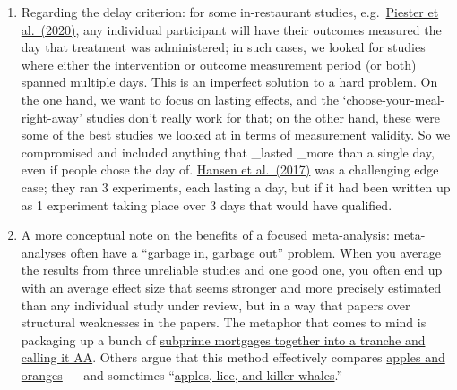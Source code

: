 \documentclass[
  letterpaper,
  DIV=11,
  numbers=noendperiod]{scrartcl}
\begin{document}
\begin{enumerate}
{  al.~(2021b)}, who find a substantial ``discrepancy between intentions
  and reported consumption'' and conclude that ``reported intentions may
  be a poor proxy for reported actual consumption'' (this is a
  well-understood problem in
  \href{https://pubmed.ncbi.nlm.nih.gov/7635601/}{dietary},
  \href{https://www.ncbi.nlm.nih.gov/pmc/articles/PMC6125069/}{health},
  \href{https://www.sciencedirect.com/science/article/abs/pii/S0148296322003848}{and}
  \href{https://www.frontiersin.org/articles/10.3389/fpsyg.2022.923464/full}{psychology}
  \href{https://www.ncbi.nlm.nih.gov/pmc/articles/PMC2346472/}{research}).
\item
  Regarding the delay criterion: for some in-restaurant studies,
  e.g.~\href{https://www.sciencedirect.com/science/article/abs/pii/S0195666319312115?via\%3Dihub}{Piester
  et al.~(2020)}, any individual participant will have their outcomes
  measured the day that treatment was administered; in such cases, we
  looked for studies where either the intervention or outcome
  measurement period (or both) spanned multiple days. This is an
  imperfect solution to a hard problem. On the one hand, we want to
  focus on lasting effects, and the `choose-your-meal-right-away'
  studies don't really work for that; on the other hand, these were some
  of the best studies we looked at in terms of measurement validity. So
  we compromised and included anything that \_lasted \_more than a
  single day, even if people chose the day of.
  \href{https://academic.oup.com/jpubhealth/article/43/2/392/5637580}{Hansen
  et al.~(2017)} was a challenging edge case; they ran 3 experiments,
  each lasting a day, but if it had been written up as 1 experiment
  taking place over 3 days that would have qualified.
\item
  A more conceptual note on the benefits of a focused meta-analysis:
  meta-analyses often have a ``garbage in, garbage out'' problem. When
  you average the results from three unreliable studies and one good
  one, you often end up with an average effect size that seems stronger
  and more precisely estimated than any individual study under review,
  but in a way that papers over structural weaknesses in the papers. The
  metaphor that comes to mind is packaging up a bunch of
  \href{https://www.youtube.com/watch?v=II4Ct2n5FiE}{subprime mortgages
  together into a tranche and calling it AA}. Others argue that this
  method effectively compares
  \href{https://onlinelibrary.wiley.com/doi/abs/10.1111/ajps.12742}{apples
  and oranges} --- and sometimes
  ``\href{https://vitamindwiki.com/The+Misuse+of+Meta-analysis+in+Nutrition+Research+\%28and+vitamin+D\%29+\%E2\%80\%93+JAMA+Oct+2017}{apples,
  lice, and killer whales}.''
\end{enumerate}
\end{document}
